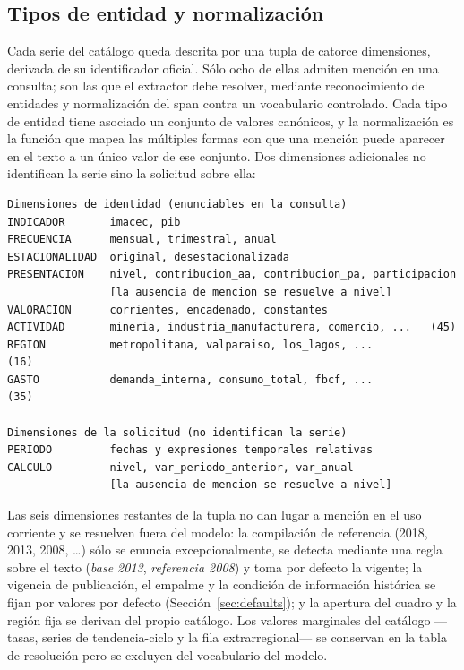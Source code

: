 \documentclass[11pt]{article}
\begin{document}
\subsection{Tipos de entidad y normalización}
\label{sec:entidades}

Cada serie del catálogo queda descrita por una tupla de catorce dimensiones,
derivada de su identificador oficial. Sólo ocho de ellas admiten mención en una
consulta; son las que el extractor debe resolver, mediante reconocimiento de
entidades y normalización del span contra un vocabulario controlado. Cada tipo
de entidad tiene asociado un conjunto de valores canónicos, y la normalización
es la función que mapea las múltiples formas con que una mención puede aparecer
en el texto a un único valor de ese conjunto. Dos dimensiones adicionales no
identifican la serie sino la solicitud sobre ella:

\begin{verbatim}
Dimensiones de identidad (enunciables en la consulta)
INDICADOR       imacec, pib
FRECUENCIA      mensual, trimestral, anual
ESTACIONALIDAD  original, desestacionalizada
PRESENTACION    nivel, contribucion_aa, contribucion_pa, participacion
                [la ausencia de mencion se resuelve a nivel]
VALORACION      corrientes, encadenado, constantes
ACTIVIDAD       mineria, industria_manufacturera, comercio, ...   (45)
REGION          metropolitana, valparaiso, los_lagos, ...          (16)
GASTO           demanda_interna, consumo_total, fbcf, ...          (35)

Dimensiones de la solicitud (no identifican la serie)
PERIODO         fechas y expresiones temporales relativas
CALCULO         nivel, var_periodo_anterior, var_anual
                [la ausencia de mencion se resuelve a nivel]
\end{verbatim}

\medskip

\noindent Las seis dimensiones restantes de la tupla no dan lugar a mención en
el uso corriente y se resuelven fuera del modelo: la compilación de referencia
(2018, 2013, 2008, \dots) sólo se enuncia excepcionalmente, se detecta mediante
una regla sobre el texto (\emph{base 2013}, \emph{referencia 2008}) y toma por
defecto la vigente; la vigencia de publicación, el empalme y la condición de
información histórica se fijan por valores por defecto
(Sección~\ref{sec:defaults}); y la apertura del cuadro y la región fija se derivan
del propio catálogo. Los valores marginales del catálogo ---tasas, series de
tendencia-ciclo y la fila extrarregional--- se conservan en la tabla de resolución
pero se excluyen del vocabulario del modelo.
\end{document}
